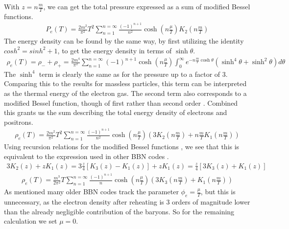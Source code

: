 With $z=n\frac{m }{T}$, we can get the total pressure expressed as a sum of modified Bessel functions.
\begin{align}
    P_e(T)=\frac{2m^2}{\pi^2} T^2 \sum_{n=1}^{n=\infty} \frac{(-1)^{n+1}}{n^{2}} \cosh{\left(n\frac{\mu}{T}\right)}   K_2\left(n\frac{m }{T}\right)
    \label{Pelectron}
\end{align}
The energy density can be found by the same way, by first utilizing the identity $cosh^2=sinh^2+1$, to get the energy density in terms of $\sinh\theta$.
\begin{align}
    \rho_e(T)=\rho_-+\rho_+=\frac{2m^4}{\pi^2}\sum_{n=1}^{n=\infty} (-1)^{n+1} \cosh{\left(n\frac{\mu}{T}\right)}  \int_{0}^{\infty}e^{-n\frac{m }{T}\cosh\theta}\left(\sinh^4\theta +\sinh^2\theta\right) d\theta
\end{align}
The $\sinh^4$ term is clearly the same as for the pressure up to a factor of 3. Comparing this to the results for massless particles, this term can be interpreted as the thermal energy of the electron gas. The second term also corresponds to a modified Bessel function, though of first rather than second order \cite[\href{https://dlmf.nist.gov/10.32.E8}{(10.32.8)}]{NIST:DLMF}. Combined this grants us the sum describing the total energy density of electrons and positrons.
\begin{align}
    \rho_e(T)=\frac{2m^2}{\pi^2} T^2 \sum_{n=1}^{n=\infty} \frac{(-1)^{n+1}}{n^{2}} \cosh{\left(n\frac{\mu}{T}\right)}  \left( 3 K_2\left(n\frac{m }{T}\right) + n\frac{m }{T} K_1\left(n\frac{m }{T}\right) \right)
    \label{rhoelectron}
\end{align}
Using recursion relations for the modified Bessel functions \cite[\href{https://dlmf.nist.gov/10.29.E1}{(10.29.1)}]{NIST:DLMF}, we see that this is equivalent to the expression used in other BBN codes \cite{Kawano}.
\begin{align}
3K_{2}(z)+z K_{1}(z)=3\frac{z}{4}[K_{3}(z)-K_{1}(z)]+z K_{1}(z)=\frac{z}{4}[3K_{3}(z)+K_{1}(z)]
\end{align}
\begin{align}
    \rho_e(T)=\frac{m^3}{2\pi^2} T \sum_{n=1}^{n=\infty} \frac{(-1)^{n+1}}{n} \cosh{\left(n\frac{\mu}{T}\right)}  \left( 3 K_3\left(n\frac{m }{T}\right) + K_1\left(n\frac{m }{T}\right) \right)
\end{align}
As mentioned many older BBN codes track the parameter $\phi_e=\frac{\mu}{T}$, but this is unnecessary, as the electron density after reheating is 3 orders of magnitude lower than the already negligible contribution of the baryons. So for the remaining calculation we set $\mu = 0$.

